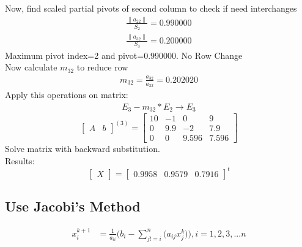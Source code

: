 \documentclass{article}
\begin{document}
Now, find scaled partial pivots of second column to check if need interchanges
\begin{align}
	\frac{\|a_{22}\|}{S_{2}}=0.990000\\
	\frac{\|a_{32}\|}{S_{3}}=0.200000
\end{align}
Maximum pivot index=2 and pivot=0.990000. No Row Change\\
Now calculate $m_{32}$ to reduce row 
\begin{align}
	m_{32}=\frac{a_{32}}{a_{22}}=0.202020
\end{align}
Apply this operations on matrix:
\begin{align}
	E_{3}-m_{32}*E_{2}\rightarrow E_{3}
\end{align}
\[
\left[
\begin{array}{c|c}
A&b
\end{array}
\right]^{(3)}
=
\left[
\begin{array}{ccc|c}
	10&-1&0&9\\
	0&9.9&-2&7.9\\
	0&0&9.596&7.596 
\end{array}
\right]
\]
Solve matrix with backward substitution.\\
Results:
\[
\begin{bmatrix}
X
\end{bmatrix}
=
\begin{bmatrix}
	0.9958&0.9579&0.7916
\end{bmatrix}^t
\]
\newpage
\subsection{Use Jacobi's Method}
\begin{align}
	x_{i}^{k+1}&=\frac{1}{a_{ii}}\Bigg(b_{i}-\sum_{j!=i}^n\bigg(a_{ij}x_{j}^k\bigg)\Bigg), i=1,2,3,...n
\end{align}
\end{document}
